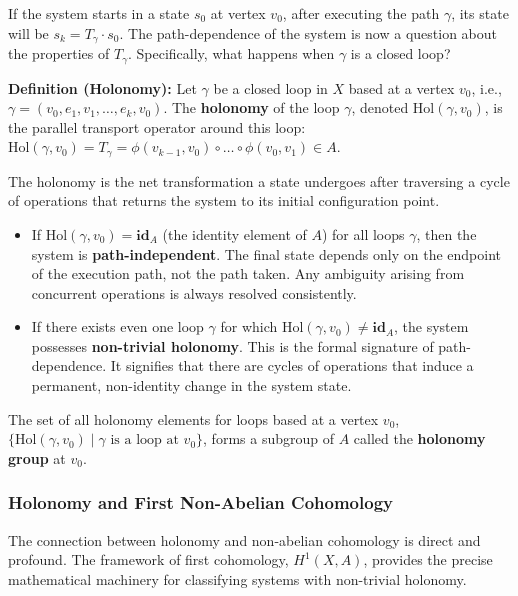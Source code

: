 \documentclass[
]{article}
\providecommand{\tightlist}{%
  \setlength{\itemsep}{0pt}\setlength{\parskip}{0pt}}
\begin{document}
If the system starts in a state \(s_0\) at vertex \(v_0\), after
executing the path \(\gamma\), its state will be
\(s_k = T_\gamma \cdot s_0\). The path-dependence of the system is now a
question about the properties of \(T_\gamma\). Specifically, what
happens when \(\gamma\) is a closed loop?

\textbf{Definition (Holonomy):} Let \(\gamma\) be a closed loop in \(X\)
based at a vertex \(v_0\), i.e.,
\(\gamma = (v_0, e_1, v_1, \dots, e_k, v_0)\). The \textbf{holonomy} of
the loop \(\gamma\), denoted \(\text{Hol}(\gamma, v_0)\), is the
parallel transport operator around this loop:
\(\text{Hol}(\gamma, v_0) = T_\gamma = \phi(v_{k-1}, v_0) \circ \dots \circ \phi(v_0, v_1) \in A\).

The holonomy is the net transformation a state undergoes after
traversing a cycle of operations that returns the system to its initial
configuration point.

\begin{itemize}
\tightlist
\item
  If \(\text{Hol}(\gamma, v_0) = \mathbf{id}_A\) (the identity element
  of \(A\)) for all loops \(\gamma\), then the system is
  \textbf{path-independent}. The final state depends only on the
  endpoint of the execution path, not the path taken. Any ambiguity
  arising from concurrent operations is always resolved consistently.
\item
  If there exists even one loop \(\gamma\) for which
  \(\text{Hol}(\gamma, v_0) \neq \mathbf{id}_A\), the system possesses
  \textbf{non-trivial holonomy}. This is the formal signature of
  path-dependence. It signifies that there are cycles of operations that
  induce a permanent, non-identity change in the system state.
\end{itemize}

The set of all holonomy elements for loops based at a vertex \(v_0\),
\(\{\text{Hol}(\gamma, v_0) \mid \gamma \text{ is a loop at } v_0\}\),
forms a subgroup of \(A\) called the \textbf{holonomy group} at \(v_0\).

\subsubsection{Holonomy and First Non-Abelian
Cohomology}\label{holonomy-and-first-non-abelian-cohomology}

The connection between holonomy and non-abelian cohomology is direct and
profound. The framework of first cohomology, \(H^1(X, A)\), provides the
precise mathematical machinery for classifying systems with non-trivial
holonomy.
\end{document}

